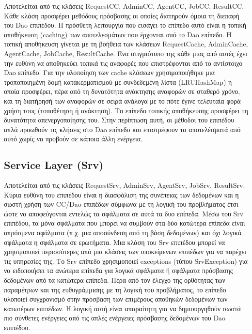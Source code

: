 \documentclass[a4paper,11pt]{article}
\begin{document}
\begin{sloppypar}
Αποτελείται από τις κλάσεις RequestCC, AdminCC, AgentCC, JobCC, ResultCC. Κάθε κλάση προσφέρει μεθόδους πρόσβασης οι οποίες διατηρούν όμοια τη διεπαφή του Dao επιπέδου. Η πρόσθετη λειτουργία που εισάγει το επίπεδο αυτό είναι η τοπική αποθήκευση (caching) των αποτελεσμάτων που έρχονται από το Dao επίπεδο. Η τοπική αποθήκευση γίνεται με τη βοήθεια των κλάσεων RequestCache, AdminCache, AgentCache, JobCache, ResultCache. Ένα στιγμιότυπο της κάθε μιας από αυτές έχει την ευθύνη να αποθηκεύει τοπικά τις αναφορές που επιστρέφονται από το αντίστοιχο Dao επίπεδο. Για την υλοποίηση των cache κλάσεων χρησιμοποιήθηκε μια τροποποιημένη δομή κατακερματισμού με συνδεδεμένη λίστα (LRUHashMap) η οποία προσφέρει, πέρα από τη δυνατότητα ανάκτησης αναφορών σε σταθερό χρόνο, και τη διατήρησή των αναφορών σε σειρά ανάλογα με το πότε έγινε τελευταία φορά χρήση τους (τοποθέτηση ή ανάκτηση). Το επίπεδο τοπικής αποθήκευσης προσφέρει τη δυνατότητα απενεργοποίησης του. Στην περίπτωση αυτή, οι μέθοδοι του επιπέδου απλά προωθούν τις κλήσεις στο Dao επίπεδο και επιστρέφουν τα αποτελέσματά από αυτό χωρίς να προβούν σε κάποια άλλη ενέργεια.

\subsection{Service Layer (Srv)}

Αποτελείται από τις κλάσεις RequestSrv, AdminSrv, AgentSrv, JobSrv, ResultSrv. Κύρια ευθύνη του επιπέδου είναι η διασφάλιση της συνέπειας των δεδομένων και η σωστή χρήση των CC/Dao επιπέδων σύμφωνα με τη λογική του προβλήματος έτσι ώστε να αποφεύγονται εντελώς τα σφάλματα σε αυτά τα δυο επίπεδα. Μέσω του Srv επιπέδου, τα μόνα σφάλματα που μπορεί να συμβούν στα δύο κατώτερα επίπεδα είναι απρόσμενα σφάλματα (π.χ. μια αποσύνδεση από τη βάση δεδομένων) και όχι λογικά σφάλματα η σφάλματα σε ερωτήματα. Μια κλάση του Srv επιπέδου μπορεί να χρησιμοποιεί περισσότερες από μια κλάσεις των υποκείμενων επιπέδων για να παρέχει τις υπηρεσίες της. Το Srv επίπεδο χρησιμοποιεί exceptions (τύπου SrvException) για να ειδοποιήσει τα ανώτερα επίπεδα για λογικά σφάλματα ή σφάλματα πρόσβασης δεδομένων από τα κατώτερα επίπεδα. Πέρα από τον έλεγχο της ορθότητας των παραμέτρων και της ευθυγράμμισης με τη λογική του προβλήματος, το επίπεδο υλοποιεί συγχρονισμό στην πρόσβαση των επιμέρους αποθηκών δεδομένων των κατωτέρων επιπέδων. Η λογική αυτή είναι απαραίτητη για να δημιουργηθούν σωστά πιο σύνθετες ενέργειες από τις απλές ενέργειες πρόσβασης δεδομένων του Dao επιπέδου.


\end{sloppypar}
\end{document}
